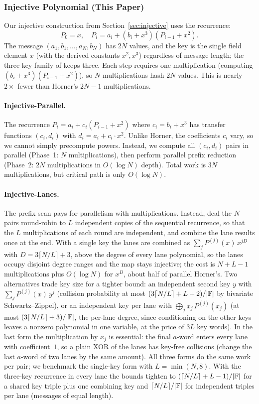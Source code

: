 \subsubsection{Injective Polynomial (This Paper)}

Our injective construction from Section~\ref{sec:injective} uses the recurrence:
\[
P_0 = x, \quad P_i = a_i + (b_i + x^3)(P_{i-1} + x^2).
\]
The message $(a_1, b_1, \ldots, a_N, b_N)$ has $2N$ values, and the key is the single field element $x$ (with the derived
constants $x^2,x^3$) regardless of message length; the three-key family of  keeps three.
Each step requires one multiplication (computing $(b_i + x^3)(P_{i-1} + x^2)$),
so $N$ multiplications hash $2N$ values.
This is nearly $2\times$ fewer than Horner's $2N-1$ multiplications.

\paragraph{Injective-Parallel.}
The recurrence $P_i = a_i + c_i(P_{i-1} + x^2)$ where $c_i = b_i + x^3$ has transfer functions
$(c_i, d_i)$ with $d_i = a_i + c_i \cdot x^2$.
Unlike Horner, the coefficients $c_i$ vary, so we cannot simply precompute powers.
Instead, we compute all $(c_i, d_i)$ pairs in parallel (Phase~1: $N$ multiplications),
then perform parallel prefix reduction (Phase~2: $2N$ multiplications in $O(\log N)$ depth).
Total work is $3N$ multiplications, but critical path is only $O(\log N)$.

\paragraph{Injective-Lanes.}
The prefix scan pays for parallelism with multiplications.  Instead, deal the
$N$ pairs round-robin to $L$ independent copies of the sequential recurrence,
so that the $L$ multiplications of each round are independent, and combine the
lane results once at the end.  With a single key the lanes are combined as
$\sum_j P^{(j)}(x)\,x^{jD}$ with $D=3\lceil N/L\rceil+3$, above the degree of
every lane polynomial, so the lanes occupy disjoint degree ranges and the map
stays injective; the cost is $N+L-1$ multiplications plus $O(\log N)$ for
$x^D$, about half of parallel Horner's.  Two alternatives trade key size for a
tighter bound: an independent second key $y$ with $\sum_j P^{(j)}(x)\,y^j$
(collision probability at most $(3\lceil N/L\rceil+L+2)/|\mathbb{F}|$ by bivariate
Schwartz--Zippel), or an independent key per lane with
$\bigoplus_j x_j\,P^{(j)}(x_j)$ (at most $(3\lceil N/L\rceil+3)/|\mathbb{F}|$, the
per-lane degree, since conditioning on the other keys leaves a nonzero
polynomial in one variable, at the price of $3L$ key words).  In the last form
the multiplication by $x_j$ is essential: the final $a$-word enters every lane
with coefficient~$1$, so a plain XOR of the lanes has key-free collisions
(change the last $a$-word of two lanes by the same amount).  All three forms do
the same work per pair; we benchmark the single-key form with $L=\min(N,8)$.
With the three-key recurrence in every lane the bounds tighten to
$(\lceil N/L\rceil+L-1)/|\mathbb{F}|$ for a shared key triple plus one combining key
and $\lceil N/L\rceil/|\mathbb{F}|$ for independent triples per lane (messages of
equal length).

